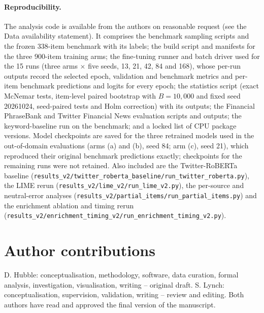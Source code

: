 \documentclass{aims}
\numberwithin{equation}{section}
\begin{document}
\paragraph{Reproducibility.}\label{sec:reprod}
The analysis code is available from the authors on reasonable request (see the Data
availability statement). It comprises the benchmark sampling scripts and the frozen 338-item
benchmark with its labels; the build script and manifests for the three 900-item
training arms; the fine-tuning runner and batch driver used for the 15 runs (three
arms $\times$ five seeds, 13, 21, 42, 84 and 168), whose per-run outputs record the
selected epoch, validation and benchmark metrics and per-item benchmark predictions
and logits for every epoch; the statistics script (exact McNemar tests, item-level
paired bootstrap with $B = 10{,}000$ and fixed seed 20261024, seed-paired tests and
Holm correction) with its outputs; the Financial PhraseBank and Twitter Financial
News evaluation scripts and outputs; the keyword-baseline run on the benchmark; and a
locked list of CPU package versions. Model checkpoints are saved for the three
retrained models used in the out-of-domain evaluations (arms (a) and (b), seed 84;
arm (c), seed 21), which reproduced their original benchmark predictions exactly;
checkpoints for the remaining runs were not retained. Also included are the
Twitter-RoBERTa baseline (\texttt{results\_v2/twitter\_roberta\_baseline/run\_twitter\_roberta.py}),
the LIME rerun (\texttt{results\_v2/lime\_v2/run\_lime\_v2.py}), the per-source and
neutral-error analyses (\texttt{results\_v2/partial\_items/run\_partial\_items.py}) and the
enrichment ablation and timing rerun (\texttt{results\_v2/enrichment\_timing\_v2/run\_enrichment\_timing\_v2.py}).

\section*{Author contributions}
D. Hubble: conceptualisation, methodology, software, data curation, formal analysis,
investigation, visualisation, writing -- original draft. S. Lynch: conceptualisation,
supervision, validation, writing -- review and editing. Both authors have read and
approved the final version of the manuscript.
\end{document}
